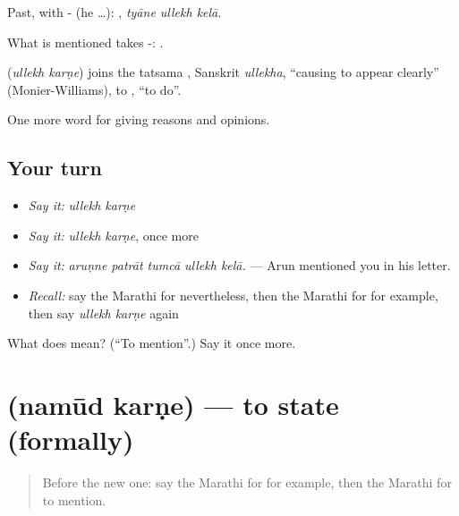 Past, with - (he …):   , \emph{tyāne ullekh kelā}.

What is mentioned takes -:  .

\begin{cousinweb}
\textbf{ } (\emph{ullekh karṇe}) joins the tatsama , Sanskrit \emph{ullekha}, \textquotedblleft{}causing to appear clearly\textquotedblright{} (Monier-Williams), to , \textquotedblleft{}to do\textquotedblright{}.
\end{cousinweb}

\begin{grammarlens}[title={What you've built}]
One more word for giving reasons and opinions.
\end{grammarlens}

\subsection*{Your turn}
\begin{itemize}
\raggedright
  \item \emph{Say it:} \emph{ullekh karṇe}
  \item \emph{Say it:} \emph{ullekh karṇe}, once more
  \item \emph{Say it:} \emph{aruṇne patrāt tumcā ullekh kelā.} — Arun mentioned you in his letter.
  \item \emph{Recall:} say the Marathi for nevertheless, then the Marathi for for example, then say \emph{ullekh karṇe} again
\end{itemize}

\begin{tcolorbox}[breakable,colback=teal!4,colframe=teal!35!black,title={Before you move on}]
What does   mean? (\textquotedblleft{}To mention\textquotedblright{}.) Say it once more.
\end{tcolorbox}
\section[\texorpdfstring{\mr{नमूद} \mr{करणे} (namūd karṇe)}{नमूद करणे (namūd karṇe)}]{  (namūd karṇe) — to state (formally)}

\label{lesson:MR-C352-namud-karne}



\begin{quote}
Before the new one: say the Marathi for for example, then the Marathi for to mention.
\end{quote}

